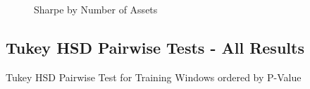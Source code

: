 \documentclass{article}
\begin{document}
\begin{figure}[h]
    \label{fig:time_series_n_assets}
    \centering
    \caption{Sharpe by Number of Assets}
\end{figure}

\FloatBarrier
\subsection*{Tukey HSD Pairwise Tests - All Results}

\begin{table}[h]
    \label{tab:tukeyhsd_all_training_window}
    \centering
    {\scriptsize
        
    }
    \caption{Tukey HSD Pairwise Test for Training Windows ordered by P-Value}
\end{table}
\end{document}
